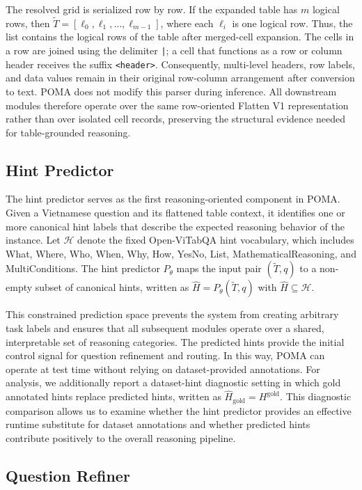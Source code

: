 \documentclass[]{interact}
\begin{document}
The resolved grid is serialized row by row. If the expanded table has $m$ logical rows, then $\tilde{T}=[\ell_0,\ell_1,\ldots,\ell_{m-1}]$, where each $\ell_i$ is one logical row. Thus, the list contains the logical rows of the table after merged-cell expansion. The cells in a row are joined using the delimiter \texttt{|}; a cell that functions as a row or column header receives the suffix \texttt{<header>}. Consequently, multi-level headers, row labels, and data values remain in their original row-column arrangement after conversion to text. POMA does not modify this parser during inference. All downstream modules therefore operate over the same row-oriented Flatten V1 representation rather than over isolated cell records, preserving the structural evidence needed for table-grounded reasoning.

\subsection{Hint Predictor}

The hint predictor serves as the first reasoning-oriented component in POMA. Given a Vietnamese question and its flattened table context, it identifies one or more canonical hint labels that describe the expected reasoning behavior of the instance. Let $\mathcal{H}$ denote the fixed Open-ViTabQA hint vocabulary, which includes What, Where, Who, When, Why, How, YesNo, List, MathematicalReasoning, and MultiConditions. The hint predictor $P_{\theta}$ maps the input pair $(\tilde{T},q)$ to a non-empty subset of canonical hints, written as $\hat{H}=P_{\theta}(\tilde{T},q)$ with $\hat{H}\subseteq\mathcal{H}$.

This constrained prediction space prevents the system from creating arbitrary task labels and ensures that all subsequent modules operate over a shared, interpretable set of reasoning categories. The predicted hints provide the initial control signal for question refinement and routing. In this way, POMA can operate at test time without relying on dataset-provided annotations. For analysis, we additionally report a dataset-hint diagnostic setting in which gold annotated hints replace predicted hints, written as $\hat{H}_{\mathrm{gold}}=H^{\mathrm{gold}}$. This diagnostic comparison allows us to examine whether the hint predictor provides an effective runtime substitute for dataset annotations and whether predicted hints contribute positively to the overall reasoning pipeline.

\subsection{Question Refiner}
\end{document}
